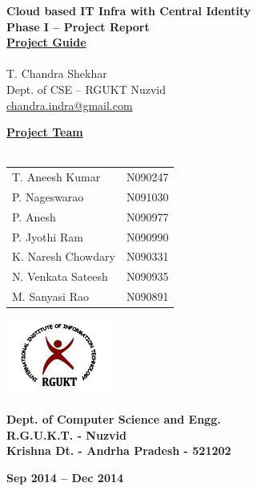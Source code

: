 \documentclass[12pt]{report}
\begin{document}
\begin{titlepage}
 \begin{center}
\LARGE
\textbf{Cloud based IT Infra with Central Identity} \\
\vfill
\textbf{Phase I -- Project Report }\\
\vfill
\Large
\underline{\textbf{Project Guide }} \\ 
\large
\underline{} \\
T. Chandra Shekhar \\
\small
Dept. of CSE -- RGUKT Nuzvid \\
\small
\url{chandra.indra@gmail.com}
\vfill

\Large
\textbf{\underline{ Project Team } } \\
\underline{} \\
\large
\begin{tabular}{l  l}
T. Aneesh Kumar & N090247  \\
P. Nageswarao  & N091030  \\
P. Anesh  & N090977  \\
P. Jyothi Ram & N090990  \\
K. Naresh Chowdary  & N090331  \\
N. Venkata Sateesh  & N090935  \\
M. Sanyasi Rao & N090891 
\end{tabular}

\vfill


\includegraphics[width=3.5cm]{rgukt_logo.jpg} 
\Large
\underline{} \\
\underline{} \\
\normalsize
\textbf{Dept. of Computer Science and Engg. } \\
\textbf{R.G.U.K.T. - Nuzvid } \\
\textbf{Krishna Dt. - Andrha Pradesh - 521202}


\normalsize
\vfill
%
%

\textbf{Sep 2014 -- Dec 2014 }

\end{center}
\end{titlepage}
\end{document}
